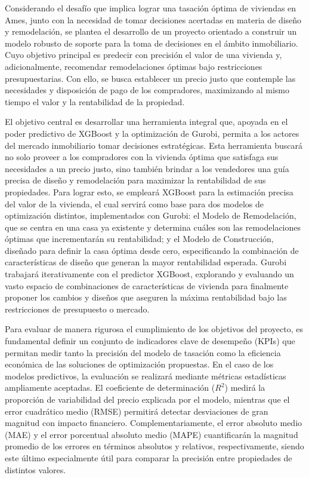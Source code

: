 Considerando el desafío que implica lograr una tasación óptima de viviendas en Ames, junto con la necesidad de tomar decisiones acertadas en materia de diseño y remodelación, se plantea el desarrollo de un proyecto orientado a construir un modelo robusto de soporte para la toma de decisiones en el ámbito inmobiliario. Cuyo objetivo principal es predecir con precisión el valor de una vivienda y, adicionalmente, recomendar remodelaciones óptimas bajo restricciones presupuestarias. Con ello, se busca establecer un precio justo que contemple las necesidades y disposición de pago de los compradores, maximizando al mismo tiempo el valor y la rentabilidad de la propiedad. 

El objetivo central es desarrollar una herramienta integral que, apoyada en el poder predictivo de XGBoost y la optimización de Gurobi, permita a los actores del mercado inmobiliario tomar decisiones estratégicas. Esta herramienta buscará no solo proveer a los compradores con la vivienda óptima que satisfaga sus necesidades a un precio justo, sino también brindar a los vendedores una guía precisa de diseño y remodelación para maximizar la rentabilidad de sus propiedades. Para lograr esto, se empleará XGBoost para la estimación precisa del valor de la vivienda, el cual servirá como base para dos modelos de optimización distintos, implementados con Gurobi: el Modelo de Remodelación, que se centra en una casa ya existente y determina cuáles son las remodelaciones óptimas que incrementarán su rentabilidad; y el Modelo de Construcción, diseñado para definir la casa óptima desde cero, especificando la combinación de características de diseño que generan la mayor rentabilidad esperada. Gurobi trabajará iterativamente con el predictor XGBoost, explorando y evaluando un vasto espacio de combinaciones de características de vivienda para finalmente proponer los cambios y diseños que aseguren la máxima rentabilidad bajo las restricciones de presupuesto o mercado.


Para evaluar de manera rigurosa el cumplimiento de los objetivos del proyecto, es fundamental definir un conjunto de indicadores clave de desempeño (KPIs) que permitan medir tanto la precisión del modelo de tasación como la eficiencia económica de las soluciones de optimización propuestas. En el caso de los modelos predictivos, la evaluación se realizará mediante métricas estadísticas ampliamente aceptadas. El coeficiente de determinación ($R^2$) medirá la proporción de variabilidad del precio explicada por el modelo, mientras que el error cuadrático medio (RMSE) permitirá detectar desviaciones de gran magnitud con impacto financiero. Complementariamente, el error absoluto medio (MAE) y el error porcentual absoluto medio (MAPE) cuantificarán la magnitud promedio de los errores en términos absolutos y relativos, respectivamente, siendo este último especialmente útil para comparar la precisión entre propiedades de distintos valores.

